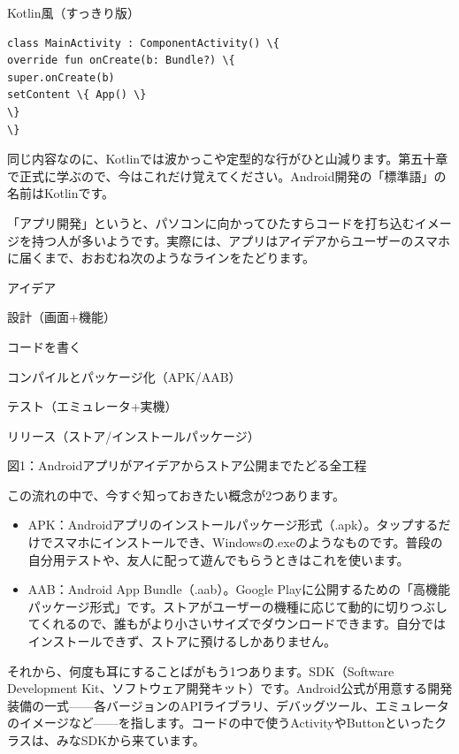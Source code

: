 Kotlin風（すっきり版）

\begin{lstlisting}
class MainActivity : ComponentActivity() \{
override fun onCreate(b: Bundle?) \{
super.onCreate(b)
setContent \{ App() \}
\}
\}
\end{lstlisting}

同じ内容なのに、Kotlinでは波かっこや定型的な行がひと山減ります。第五十章で正式に学ぶので、今はこれだけ覚えてください。Android開発の「標準語」の名前はKotlinです。


「アプリ開発」というと、パソコンに向かってひたすらコードを打ち込むイメージを持つ人が多いようです。実際には、アプリはアイデアからユーザーのスマホに届くまで、おおむね次のようなラインをたどります。

アイデア

設計（画面+機能）

コードを書く

コンパイルとパッケージ化（APK/AAB）

テスト（エミュレータ+実機）

リリース（ストア/インストールパッケージ）

\begin{center}\small\color{gray}図1：Androidアプリがアイデアからストア公開までたどる全工程\end{center}

この流れの中で、今すぐ知っておきたい概念が2つあります。

\begin{itemize}
  \item APK：Androidアプリのインストールパッケージ形式（.apk）。タップするだけでスマホにインストールでき、Windowsの.exeのようなものです。普段の自分用テストや、友人に配って遊んでもらうときはこれを使います。
  \item AAB：Android App Bundle（.aab）。Google Playに公開するための「高機能パッケージ形式」です。ストアがユーザーの機種に応じて動的に切りつぶしてくれるので、誰もがより小さいサイズでダウンロードできます。自分ではインストールできず、ストアに預けるしかありません。
\end{itemize}

それから、何度も耳にすることばがもう1つあります。SDK（Software Development Kit、ソフトウェア開発キット）です。Android公式が用意する開発装備の一式——各バージョンのAPIライブラリ、デバッグツール、エミュレータのイメージなど——を指します。コードの中で使うActivityやButtonといったクラスは、みなSDKから来ています。


